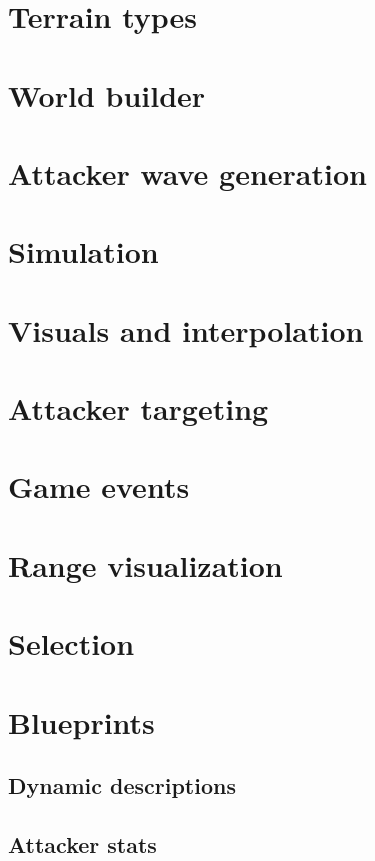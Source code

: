 \section{Terrain types}

\section{World builder}

\section{Attacker wave generation}

\section{Simulation}

\section{Visuals and interpolation}

\section{Attacker targeting}

\section{Game events}

\section{Range visualization}

\section{Selection}

\section{Blueprints}

\subsection{Dynamic descriptions}

\subsection{Attacker stats}